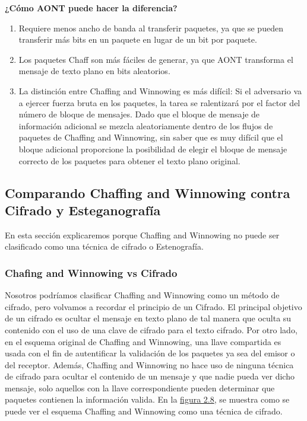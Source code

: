 \documentclass[12pt, a4paper, titlepage]{report}
\begin{document}
        \textbf{¿Cómo AONT puede hacer la diferencia?}\\
        \begin{enumerate}
            \item Requiere menos ancho de banda al transferir paquetes, ya que se pueden transferir más bits en un paquete en lugar de un bit por paquete.
            \item Los paquetes Chaff son más fáciles de generar, ya que AONT transforma el mensaje de texto plano en bits aleatorios.
            \item La distinción entre Chaffing and Winnowing es más difícil: Si el adversario va a ejercer fuerza bruta en los paquetes, la tarea se ralentizará por el factor del número de bloque de mensajes. Dado que el bloque de mensaje de información adicional se mezcla aleatoriamente dentro de los flujos de paquetes de Chaffing and Winnowing, sin saber que es muy difícil que el bloque adicional proporcione la posibilidad de elegir el bloque de mensaje correcto de los paquetes para obtener el texto plano original.
        \end{enumerate}
        
        \subsection{Comparando Chaffing and Winnowing contra Cifrado y Esteganograf\'ia}
        
        En esta sección explicaremos porque Chaffing and Winnowing no puede ser clasificado como una técnica de cifrado o Estenografía.\\
        
        \subsubsection{Chafing and Winnowing vs Cifrado}
        
        Nosotros podríamos clasificar Chaffing and Winnowing como un método de cifrado, pero volvamos a recordar el principio de un Cifrado.
        El principal objetivo de un cifrado es ocultar el mensaje en texto plano de tal manera que oculta su contenido con el uso de una clave de cifrado para el texto cifrado.
        Por otro lado, en el esquema original de Chaffing and Winnowing, una llave compartida es usada con el fin de autentificar la validación de los paquetes ya sea del emisor o del receptor. Además, Chaffing and Winnowing no hace uso de ninguna técnica de cifrado para ocultar el contenido de un mensaje y que nadie pueda ver dicho mensaje, solo aquellos con la llave correspondiente pueden determinar que paquetes contienen la información valida. En la \hyperref[C&W_AONT]{figura 2.8}, se muestra como se puede ver el esquema Chaffing and Winnowing como una técnica de cifrado. \\
        
\end{document}
